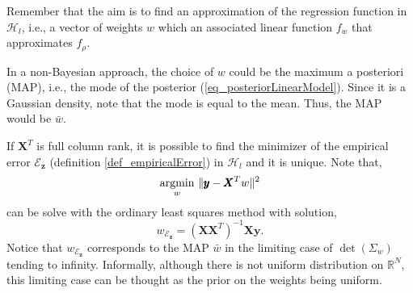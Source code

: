 Remember that the aim is to find an approximation of the regression function in $\mathcal{H}_l$, i.e., a vector of weights $w$ which an associated linear function $f_{w}$ that approximates $f_{\rho}$.

In a non-Bayesian approach, the choice of $w$ could be the maximum a posteriori (MAP), i.e., the mode of the posterior (\ref{eq_posteriorLinearModel}). Since it is a Gaussian density, note that the mode is equal to the mean. Thus, the MAP would be $\bar{w}$. 

\begin{remark} \label{remark_minimizationEmpiricalErrorLinearModel}
  If $\pmb{X}^T$ is full column rank, it is possible to find the minimizer of the empirical error $\mathcal{E}_{\pmb{z}}$ (definition \ref{def_empiricalError}) in $\mathcal{H}_l$ and it is unique. Note that,
  \begin{equation} \label{eq_minimizationWeightsEmpiricalError}
    \underset{w}{\textup{argmin}} \ \| \pmb{y} - \pmb{X}^T w \|^2
  \end{equation}
  can be solve with the ordinary least squares method with solution,
  \begin{equation*} %
    w_{\mathcal{E}_{\pmb{z}}} = (\pmb{X}\pmb{X}^T)^{-1}\pmb{X}\pmb{y}.
  \end{equation*}
  Notice that $w_{\mathcal{E}_{\pmb{z}}}$ corresponds to the MAP $\bar{w}$ in the limiting case of $\det \left( \Sigma_w \right)$ tending to infinity. Informally, although there is not uniform distribution on $\mathbb{R}^N$, this limiting case can be thought as the prior on the weights being uniform.
\end{remark}

